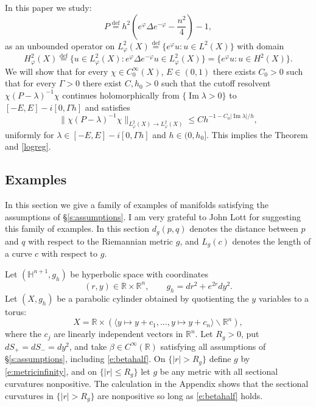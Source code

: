 \documentclass[reqno, 12pt]{amsart}
\newcommand \R {\mathbb{R}}
\newcommand \Hh {\mathbb{H}}
\newcommand \la {\langle}
\newcommand \ra {\rangle}
\newcommand \Def {\stackrel{\textrm{def}}=}
\DeclareMathOperator \im {Im}
\theoremstyle{definition}
\numberwithin{equation}{section}
\numberwithin{prop}{section}
\numberwithin{figure}{section}
\begin{document}
In this paper we study:
\begin{equation}\label{e:pdef}
P \Def h^2\left(e^{\varphi} \Delta e^{-\varphi} - \frac{n^2}4\right) - 1,
\end{equation}
as an unbounded operator on $L^2_\varphi(X) \Def \{e^\varphi u\colon u \in L^2(X)\}$ with domain \[H^2_\varphi(X) \Def \{u \in L_\varphi^2(X)\colon e^{\varphi} \Delta e^{-\varphi} u \in L_\varphi^2(X)\} = \{e^\varphi u\colon u \in H^2(X)\}.\]
We will show that for every $\chi \in C_0^\infty(X)$,  $E \in (0,1)$ there exists $C_0 > 0$ such that for every $\Gamma >0$ there exist $C,h_0>0$ such that the cutoff resolvent $\chi(P-\lambda)^{-1}\chi$ continues holomorphically from $\{\im \lambda >0\}$ to $[-E,E] - i [0,\Gamma h]$ and satisfies
\begin{equation}\label{e:main}
\|\chi(P - \lambda)^{-1}\chi\|_{L_\varphi^2(X) \to L_\varphi^2(X)} \le C h^{-1-C_0|\im\lambda|/h},
\end{equation}
uniformly for $\lambda \in [-E,E] - i [0,\Gamma h]$ and $h \in (0,h_0]$. This implies the Theorem and \eqref{logreg}.

\subsection{Examples}\label{s:examples}

In this section we give a family of examples of manifolds satisfying the assumptions of \S\ref{s:assumptions}. I am very grateful to John Lott for suggesting this family of examples. In this section $d_g(p,q)$ denotes the distance between $p$ and $q$ with respect to the Riemannian metric $g$, and $L_g(c)$ denotes the length of a curve $c$ with respect to $g$.

Let $(\Hh^{n+1},g_h)$ be hyperbolic space with coordinates
\[
(r,y) \in \R \times \R^n, \qquad g_h = dr^2 + e^{2r} dy^2.
\]
Let $(X, g_h)$ be a parabolic cylinder obtained by quotienting the $y$ variables to a torus:
\[
X = \R \times \left(\la y \mapsto y + c_1, \dots, y \mapsto y + c_n \ra \backslash \R^n\right),
\]
where the $c_j$ are linearly independent vectors in $\R^n $. Let   $R_g> 0$, put $dS_+ = dS_- = dy^2$, and take $\beta \in C^\infty(\R)$ satisfying all assumptions of \S\ref{s:assumptions}, including \eqref{e:betahalf}. On $\{|r| > R_g\}$ define $g$ by \eqref{e:metricinfinity}, and on $\{|r| \le R_g\}$   let $g$ be any metric with all sectional curvatures nonpositive. The calculation in the Appendix shows that the sectional curvatures  in $\{|r| > R_g\}$ are nonpositive so long as \eqref{e:betahalf} holds.
\end{document}
